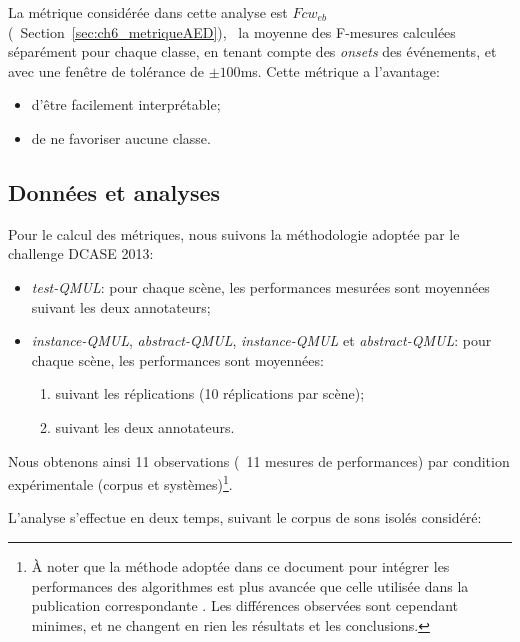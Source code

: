 La métrique considérée dans cette analyse est $Fcw_{eb}$ (\cf~Section~\ref{sec:ch6_metriqueAED}), \ie~la moyenne des F-mesures calculées séparément pour chaque classe, en tenant compte des \emph{onsets} des événements, et avec une fenêtre de tolérance de $\pm100$ms. Cette métrique a l'avantage: 

\begin{itemize}
\item d'être facilement interprétable;
\item de ne favoriser aucune classe.
\end{itemize}

\subsection{Données et analyses}

Pour le calcul des métriques, nous suivons la méthodologie adoptée par le challenge DCASE 2013:

\begin{itemize}

\item \emph{test-QMUL}: pour chaque scène, les performances mesurées sont moyennées suivant les deux annotateurs;
\item  \emph{instance-QMUL}, \emph{abstract-QMUL},  \emph{instance-QMUL} et \emph{abstract-QMUL}: pour chaque scène, les performances sont moyennées:

\begin{enumerate}
\item suivant les réplications (10 réplications par scène);
\item suivant les deux annotateurs.
\end{enumerate}

\end{itemize}

Nous obtenons ainsi 11 observations (\ie~11 mesures de performances) par condition expérimentale (corpus et systèmes)\footnote{À noter que la méthode adoptée dans ce document pour intégrer les performances des algorithmes est plus avancée que celle utilisée dans la publication correspondante \citep{lafay2016morphological}. Les différences observées sont cependant minimes, et ne changent en rien les résultats et les conclusions.}.

L'analyse s'effectue en deux temps, suivant le corpus de sons isolés considéré:

